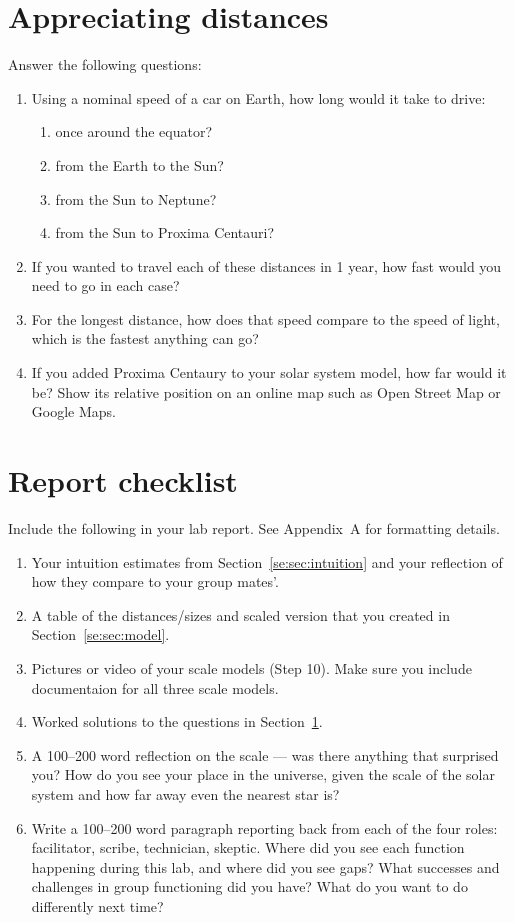 \section{Appreciating distances}\label{se:sec:calc}

Answer the following questions:
\begin{enumerate}
	\item Using a nominal speed of a car on Earth, how long would it take to drive:
	\begin{enumerate}
		\item once around the equator?
		\item from the Earth to the Sun?
		\item from the Sun to Neptune?
		\item from the Sun to Proxima Centauri?
	\end{enumerate}
	\item If you wanted to travel each of these distances in 1 year, how fast would you need to go in each case?
	\item For the longest distance, how does that speed compare to the speed of light, which is the fastest anything can go?
        \item If you added Proxima Centaury to your solar system model, how far would it be? Show its relative position on an online map such as Open Street Map or Google Maps.
\end{enumerate}

\section{Report checklist}

Include the following in your lab report. See Appendix~A for formatting details.

\begin{enumerate}
	\item Your intuition estimates from Section~\ref{se:sec:intuition} and your reflection of how they compare to your group mates'.
	\item A table of the distances/sizes and scaled version that you created in Section~\ref{se:sec:model}.
	\item Pictures or video of your scale models (Step 10). Make sure you include documentaion for all three scale models.
	\item Worked solutions to the questions in Section~\ref{se:sec:calc}.
	\item A 100--200 word reflection on the scale --- was there anything that surprised you? How do you see your place in the universe, given the scale of the solar system and how far away even the nearest star is?
	\item Write a 100--200 word paragraph reporting back from each of the four roles: facilitator, scribe, technician, skeptic. Where did you see each function happening during this lab, and where did you see gaps? What successes and challenges in group functioning did you have? What do you want to do differently next time?
\end{enumerate}

